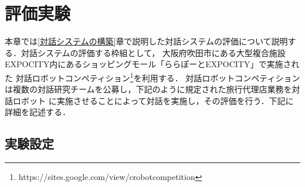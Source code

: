 \section{評価実験}
\label{評価実験}

本章では\ref{対話システムの構築}章で説明した対話システムの評価について説明する．対話システムの評価する枠組として，
大阪府吹田市にある大型複合施設EXPOCITY内にあるショッピングモール「ららぽーとEXPOCITY」で実施された
対話ロボットコンペティション\footnote{https://sites.google.com/view/crobotcompetition}を利用する．
対話ロボットコンペティションは複数の対話研究チームを公募し，下記のように規定された旅行代理店業務を対話ロボット
に実施させることによって対話を実施し，その評価を行う．下記に詳細を記述する．

\subsection{実験設定}

